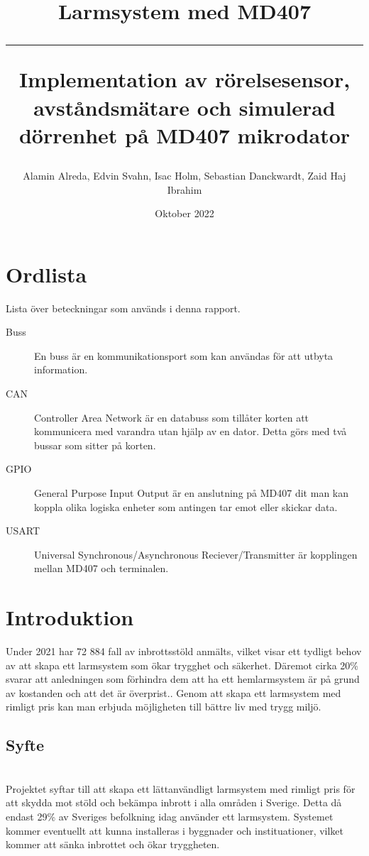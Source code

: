\documentclass{article}
\title{\textbf{Larmsystem med MD407}\\ 
         \hspace{10cm}
         \hrule
        \hspace{10cm}
        \small Implementation av rörelsesensor, avståndsmätare och simulerad dörrenhet på MD407 mikrodator}
\author{Alamin Alreda, Edvin Svahn, Isac Holm, Sebastian Danckwardt, Zaid Haj Ibrahim}
\date{Oktober 2022}
\begin{document}
\maketitle
\newpage
\tableofcontents
\newpage
\section*{Ordlista}
Lista över beteckningar som används i denna rapport.
\begin{description}

\item[Buss] En buss är en kommunikationsport som kan användas för att utbyta information.

\item[CAN] Controller Area Network är en databuss som tillåter korten att kommunicera med varandra utan hjälp av en dator. Detta görs med två bussar som sitter på korten.

\item[GPIO] General Purpose Input Output är en anslutning på MD407 dit man kan koppla olika logiska enheter som antingen tar emot eller skickar data.

\item[USART] Universal Synchronous/Asynchronous Reciever/Transmitter är kopplingen mellan MD407 och terminalen.


\end{description}
 \newpage

\setcounter{page}{1}
\section{Introduktion}
Under 2021 har 72 884 fall av inbrottsstöld anmälts, vilket visar ett tydligt behov av att skapa ett larmsystem som ökar trygghet och säkerhet.\cite{BRa} Däremot cirka 20\% svarar att anledningen som förhindra dem att ha ett hemlarmsystem är på grund av kostanden och att det är överprist.\cite{MoFor}.
Genom att skapa ett larmsystem med rimligt pris kan man erbjuda möjligheten till bättre liv med trygg miljö.

\subsection{Syfte}
\\
Projektet syftar till att skapa ett lättanvändligt larmsystem med rimligt pris för att skydda mot stöld och bekämpa inbrott i alla områden i Sverige. Detta då endast 29\% av Sveriges befolkning idag använder ett larmsystem.\cite{SSF} Systemet kommer eventuellt att kunna installeras i byggnader och instituationer, vilket kommer att sänka inbrottet och ökar tryggheten.
\end{document}

